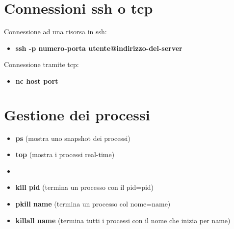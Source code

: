 \documentclass[oneside,a4paper,11pt]{book}
\theoremstyle{italicstyle}
\theoremstyle{normStyle}
\begin{document}
\section{Connessioni ssh o tcp}
Connessione ad una risorsa in ssh:

\begin{itemize}
    \item \textbf{ssh -p numero-porta utente@indirizzo-del-server}
\end{itemize}

Connessione tramite tcp:

\begin{itemize}
    \item \textbf{nc host port}
\end{itemize}

\section{Gestione dei processi}
\begin{itemize}
    \item \textbf{ps} (mostra uno snapshot dei processi)
    \item \textbf{top} (mostra i processi real-time)\item \textbf{}
    \item \textbf{kill pid} (termina un processo con il pid=pid)
    \item \textbf{pkill name} (termina un processo col nome=name)
    \item \textbf{killall name} (termina tutti i processi con il nome che inizia per name)
\end{itemize}
\end{document}
